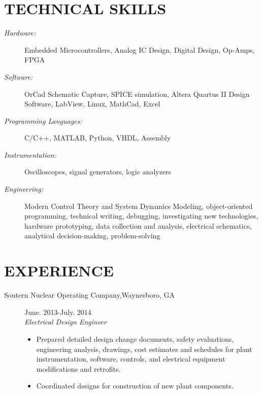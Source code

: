 \documentclass{res}
\begin{document}
 


\address{robert.savage3@gmail.com / (404)-434-3286 / \url{www.linkedin.com/in/robertmorgansavage/en}}


\begin{resume}
  

\section{TECHNICAL SKILLS}
	\begin{description}
	 	\item[\textit{Hardware:}] Embedded Microcontrollers, Analog IC Design, Digital Design, Op-Amps, FPGA
   		\item [\textit{Software:}]  OrCad Schematic Capture, SPICE simulation, Altera Quartus II Design Software, LabView, Linux,  MathCad, Excel
   		\item[\textit{Programming Languages:}]C/C++, MATLAB, Python, VHDL, Assembly 
   		\item[\textit{Instrumentation:}] Oscilloscopes, signal generators, logic analyzers
   		\item[\textit{Engineering:}]  Modern Control Theory and System Dynamics Modeling, object-oriented programming, technical writing, debugging, investigating new technologies, hardware prototyping, data collection and analysis, electrical schematics, analytical decision-making, problem-solving    
    \end{description}
    
 \section{EXPERIENCE}
    	\begin{description}
    		\item[{Soutern Nuclear Operating Company},Waynesboro, GA]\hfill June. 2013-July. 2014\\\textit{Electrical Design Engineer}
    		\vspace{-0.1in} 
    		\begin{itemize}
    		   	\item Prepared detailed design change documents, safety evaluations, engineering analysis, drawings, cost estimates and schedules for plant instrumentation, software, controls, and electrical equipment modifications and retrofits.
    		   	\item Coordinated designs for construction of new plant components. 
    		\end{itemize}
    		

\end{description}
\end{resume}
\end{document}
